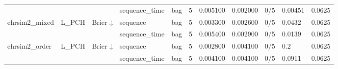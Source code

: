 \begin{tabular}{lllllrrrlll}
 &  &  & sequence\_time & bag & 5 & 0.005100 & 0.002000 & 0/5 & 0.00451 & 0.0625 \\
\cline{1-11} \cline{2-11} \cline{3-11}
\multirow[t]{2}{*}{ehrsim2\_mixed} & \multirow[t]{2}{*}{L\_PCH} & \multirow[t]{2}{*}{Brier ↓} & sequence & bag & 5 & 0.003300 & 0.002600 & 0/5 & 0.0432 & 0.0625 \\
 &  &  & sequence\_time & bag & 5 & 0.005400 & 0.002900 & 0/5 & 0.0139 & 0.0625 \\
\cline{1-11} \cline{2-11} \cline{3-11}
\multirow[t]{2}{*}{ehrsim2\_order} & \multirow[t]{2}{*}{L\_PCH} & \multirow[t]{2}{*}{Brier ↓} & sequence & bag & 5 & 0.002800 & 0.004100 & 0/5 & 0.2 & 0.0625 \\
 &  &  & sequence\_time & bag & 5 & 0.004100 & 0.004100 & 0/5 & 0.0911 & 0.0625 \\
\cline{1-11} \cline{2-11} \cline{3-11}
\bottomrule
\end{tabular}
